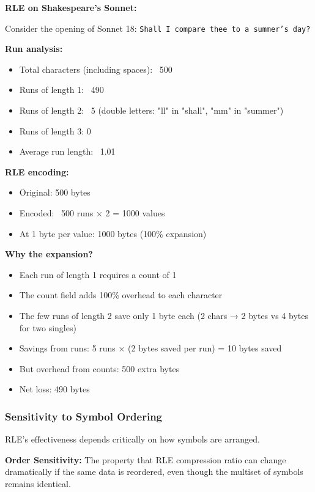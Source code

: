 \begin{examplebox}
\textbf{RLE on Shakespeare's Sonnet:}

Consider the opening of Sonnet 18:
\texttt{Shall I compare thee to a summer's day?}

\textbf{Run analysis:}
\begin{itemize}
    \item Total characters (including spaces): ~500
    \item Runs of length 1: ~490
    \item Runs of length 2: ~5 (double letters: "ll" in "shall", "mm" in "summer")
    \item Runs of length 3: 0
    \item Average run length: ~1.01
\end{itemize}

\textbf{RLE encoding:}
\begin{itemize}
    \item Original: 500 bytes
    \item Encoded: ~500 runs × 2 = 1000 values
    \item At 1 byte per value: 1000 bytes (100\% expansion)
\end{itemize}

\textbf{Why the expansion?}
\begin{itemize}
    \item Each run of length 1 requires a count of 1
    \item The count field adds 100\% overhead to each character
    \item The few runs of length 2 save only 1 byte each (2 chars → 2 bytes vs 4 bytes for two singles)
    \item Savings from runs: 5 runs × (2 bytes saved per run) = 10 bytes saved
    \item But overhead from counts: 500 extra bytes
    \item Net loss: 490 bytes
\end{itemize}
\end{examplebox}

\subsubsection{Sensitivity to Symbol Ordering}

RLE's effectiveness depends critically on how symbols are arranged.

\begin{definitionbox}
\textbf{Order Sensitivity:} The property that RLE compression ratio can change dramatically if the same data is reordered, even though the multiset of symbols remains identical.
\end{definitionbox}

